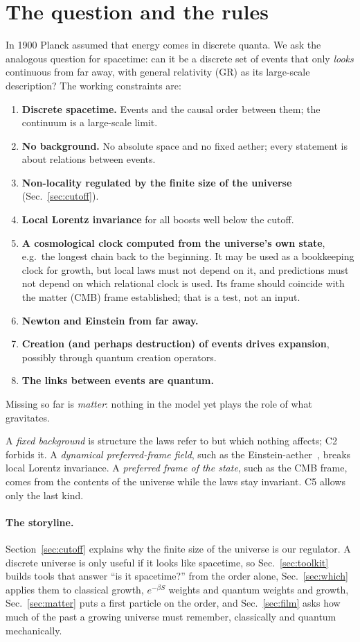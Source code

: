 \documentclass[11pt,a4paper]{article}
\newcommand{\tagbox}[2]{\textsf{\scriptsize\colorbox{#1!12}{\textcolor{#1!70!black}{#2}}}}
\newcommand{\est}{\tagbox{gray}{established}}
\begin{document}
\section{The question and the rules}
In 1900 Planck assumed that energy comes in discrete quanta. We ask the analogous question for spacetime: can it be a discrete set of events that only \emph{looks} continuous from far away, with general relativity (GR) as its large-scale description? The working constraints are:
\begin{enumerate}[label=\textbf{C\arabic*},leftmargin=*,itemsep=1pt]
\item \textbf{Discrete spacetime.} Events and the causal order between them; the continuum is a large-scale limit.
\item \textbf{No background.} No absolute space and no fixed aether; every statement is about relations between events.
\item \textbf{Non-locality regulated by the finite size of the universe} (Sec.~\ref{sec:cutoff}).
\item \textbf{Local Lorentz invariance} for all boosts well below the cutoff.
\item \textbf{A cosmological clock computed from the universe's own state}, e.g.\ the longest chain back to the beginning. It may be used as a bookkeeping clock for growth, but local laws must not depend on it, and predictions must not depend on which relational clock is used. Its frame should coincide with the matter (CMB) frame \est; that is a test, not an input.
\item \textbf{Newton and Einstein from far away.}
\item \textbf{Creation (and perhaps destruction) of events drives expansion}, possibly through quantum creation operators.
\item \textbf{The links between events are quantum.}
\end{enumerate}
Missing so far is \emph{matter}: nothing in the model yet plays the role of what gravitates.

A \emph{fixed background} is structure the laws refer to but which nothing affects; C2 forbids it. A \emph{dynamical preferred-frame field}, such as the Einstein-aether~\cite{JacobsonMattingly01}, breaks local Lorentz invariance. A \emph{preferred frame of the state}, such as the CMB frame, comes from the contents of the universe while the laws stay invariant. C5 allows only the last kind.

\paragraph{The storyline.} Section~\ref{sec:cutoff} explains why the finite size of the universe is our regulator. A discrete universe is only useful if it looks like spacetime, so Sec.~\ref{sec:toolkit} builds tools that answer ``is it spacetime?'' from the order alone, Sec.~\ref{sec:which} applies them to classical growth, $e^{-\beta S}$ weights and quantum weights and growth, Sec.~\ref{sec:matter} puts a first particle on the order, and Sec.~\ref{sec:film} asks how much of the past a growing universe must remember, classically and quantum mechanically.
\end{document}
